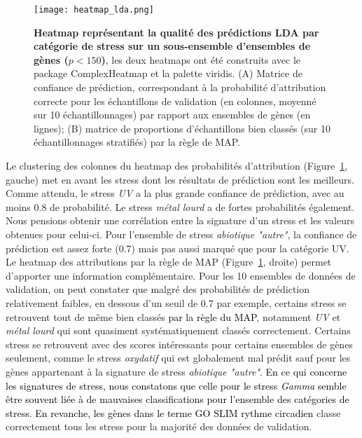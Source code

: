 \documentclass[twoside]{article}
\newcommand{\AR}[1]{\textcolor{black}{#1}}
\begin{document}
    \begin{figure}[h]
    \centering
        \texttt{[image: heatmap\_lda.png]}
        \caption[Qualité des classifications de stress prédites par la LDA]{\textbf{Heatmap représentant la qualité des prédictions LDA par catégorie de stress sur un sous-ensemble d'ensembles de gènes ($p<150$)}, les deux heatmaps ont été construits avec le package ComplexHeatmap \cite{gu_complex_2016} et la palette viridis. (A) Matrice de confiance de prédiction, correspondant à la probabilité d'attribution correcte pour les échantillons de validation (en colonnes, moyenné sur 10 échantillonnages) par rapport aux ensembles de gènes (en lignes); (B) matrice de proportions d'échantillons bien classés (sur 10 échantillonnages stratifiés) par la règle de MAP.\label{fig:lda}}
    \end{figure}

\vspace{0.5cm}Le clustering des colonnes du heatmap des probabilités d'attribution (Figure~\ref{fig:lda}, gauche) met en avant les stress dont les résultats de prédiction sont les meilleurs. Comme attendu, le stress \textit{UV} a la plus grande confiance de prédiction, avec au moins 0.8 de probabilité. Le stress \textit{métal lourd} a de fortes probabilités également. Nous pensions obtenir une corrélation entre la signature d'un stress et les valeurs obtenues pour celui-ci. Pour l'ensemble de stress \textit{abiotique "autre"}, la confiance de prédiction est assez forte (0.7) mais pas aussi marqué que pour la catégorie UV. Le heatmap des attributions par la règle de MAP (Figure~\ref{fig:lda}, droite) permet d'apporter une information complémentaire. Pour les 10 ensembles de données de validation, on peut constater que malgré des probabilités de prédiction relativement faibles, en dessous d'un seuil de 0.7 par exemple, certains stress se retrouvent tout de même bien classés \AR{par la règle du MAP}, notamment \textit{UV} et \textit{métal lourd} qui sont quasiment systématiquement classés correctement. Certains stress se retrouvent avec des scores intéressants pour certains ensembles de gènes seulement, comme le stress \textit{oxydatif} qui est globalement mal prédit sauf pour les gènes appartenant à la signature de stress  \textit{abiotique "autre"}. \AR{En ce qui concerne les signatures de stress, nous constatons que celle pour le stress \textit{Gamma} semble être souvent liée à de mauvaises classifications pour l'ensemble des catégories de stress. En revanche, les gènes dans le terme GO SLIM rythme circadien}
classe correctement tous les stress pour la majorité des données de validation.
\end{document}
